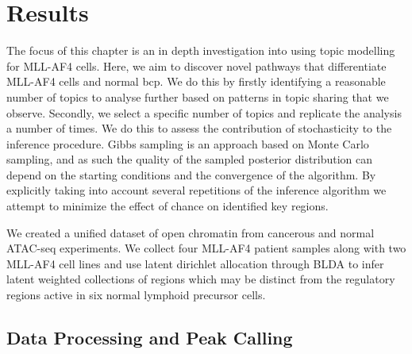 \section{Results} \label{ch5:results}

The focus of this chapter is an in depth investigation into using topic modelling for MLL-AF4 cells. Here, we aim to discover novel pathways that differentiate MLL-AF4 cells and normal \gls{bcp}. We do this by firstly identifying a reasonable number of topics to analyse further based on patterns in topic sharing that we observe. Secondly, we select a specific number of topics and replicate the analysis a number of times. We do this to assess the contribution of stochasticity to the inference procedure. Gibbs sampling is an approach based on Monte Carlo sampling, and as such the quality of the sampled posterior distribution can depend on the starting conditions and the convergence of the algorithm. By explicitly taking into account several repetitions of the inference algorithm we attempt to minimize the effect of chance on identified key regions. 

We created a unified dataset of open chromatin from cancerous and normal ATAC-seq experiments. We collect four MLL-AF4 patient samples along with two MLL-AF4 cell lines and use latent dirichlet allocation through BLDA to infer latent weighted collections of regions which may be distinct from the regulatory regions active in six normal lymphoid precursor cells.  

\subsection{Data Processing and Peak Calling}



